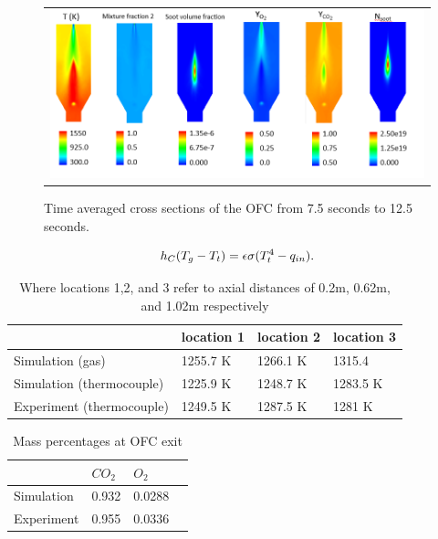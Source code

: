 \documentclass[12pt]{wssci}
\begin{document}
\begin{figure}[!h]
\begin{center}
\begin{tabular}{c}
\includegraphics[width=6 in]{../figures/results_averaged.png}
\end{tabular}
\caption{ Time averaged cross sections of the OFC from 7.5 seconds to 12.5 seconds. }
\label{f:results2}
\end{center}
\end{figure}

\begin{equation} \label{e:thermocouple}
h_{C}(T_{g}-T_{t})=\epsilon\sigma(T_{t}^4-q_{in})\\.
\end{equation}

\begin{table}[!h]
	\caption{Where locations 1,2, and 3 refer to axial distances of 0.2m, 0.62m, and 1.02m respectively  }
	\label{t:temperatures}
	\centering
	\begin{tabular}{ | l | l | l | l |}
	\hline
       & location 1 & location 2 & location 3 \\ \hline
    Simulation (gas) & 1255.7 K & 1266.1 K & 1315.4 \\ 
    Simulation (thermocouple) & 1225.9 K & 1248.7 K & 1283.5 K \\ 
    Experiment (thermocouple) & 1249.5  K & 1287.5 K & 1281 K \\ 
    \hline
    \end{tabular}
\end{table}


\begin{table}[!h]
	\caption{Mass percentages at OFC exit }
	\label{t:concentrations}
	\centering
	\begin{tabular}{ | l | l | l | l |}
	\hline
	    & $CO_2$ & $O_2$   \\ \hline
    Simulation &  0.932 & 0.0288   \\ 
    Experiment  & 0.955 & 0.0336  \\  
\hline
\end{tabular}
\end{table}
\end{document}
